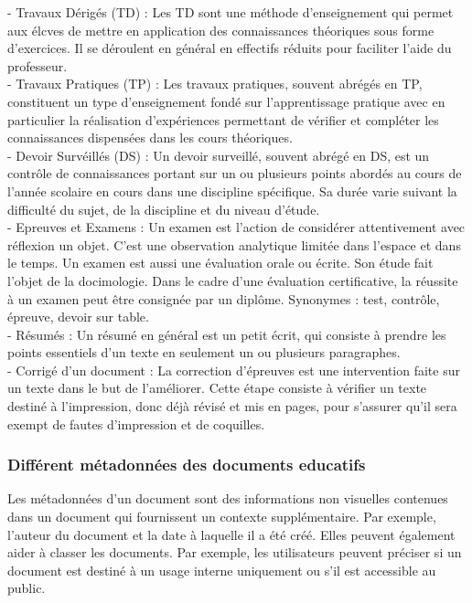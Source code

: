 \documentclass[12pt]{report}
\begin{document}
- Travaux Dérigés (TD) : Les TD sont une méthode d'enseignement qui permet aux élcves de mettre en application des connaissances théoriques sous forme d'exercices. Il se déroulent en général en effectifs réduits pour faciliter l'aide du professeur\cite{8}. \\

- Travaux Pratiques (TP) : Les travaux pratiques, souvent abrégés en TP, constituent un type d'enseignement fondé sur l'apprentissage pratique avec en particulier la réalisation d'expériences permettant de vérifier et compléter les connaissances dispensées dans les cours théoriques\cite{9}.
\\- Devoir Survéillés (DS) : Un devoir surveillé, souvent abrégé en DS, est un contrôle de connaissances portant sur un ou plusieurs points abordés au cours de l'année scolaire en cours dans une discipline spécifique. Sa durée varie suivant la difficulté du sujet, de la discipline et du niveau d'étude\cite{10}.
\\- Epreuves et Examens : Un examen est l'action de considérer attentivement avec réflexion un objet. C'est une observation analytique limitée dans l'espace et dans le temps.
Un examen est aussi une évaluation orale ou écrite. Son étude fait l'objet de la docimologie. Dans le cadre d'une évaluation certificative, la réussite à un examen peut être consignée par un diplôme. Synonymes : test, contrôle, épreuve, devoir sur table\cite{11}.
\\- Résumés : Un résumé en général est un petit écrit, qui consiste à prendre les points essentiels d'un texte en seulement un ou plusieurs paragraphes\cite{12}.
\\- Corrigé d’un document : La correction d'épreuves est une intervention faite sur un texte dans le but de l'améliorer. Cette étape consiste à vérifier un texte destiné à l'impression, donc déjà révisé et mis en pages, pour s'assurer qu'il sera exempt de fautes d'impression et de coquilles\cite{13}.


\subsubsection{Différent métadonnées des documents educatifs}

Les métadonnées d'un document sont des informations non visuelles contenues dans un document qui fournissent un contexte supplémentaire. Par exemple, l'auteur du document et la date à laquelle il a été créé. Elles peuvent également aider à classer les documents. Par exemple, les utilisateurs peuvent préciser si un document est destiné à un usage interne uniquement ou s'il est accessible au public.
\end{document}
